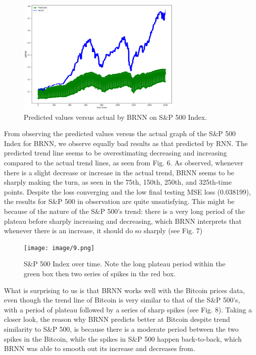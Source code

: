 \documentclass[letterpaper, 10 pt, conference]{ieeeconf}  %
\begin{document}
        \begin{figure}[thpb]
            \centering
            \includegraphics[width=8cm]{image/BiRNN/sp500_graph.png}
            \caption{Predicted values versus actual by BRNN on S\&P 500 Index.}
            \label{figurelabel}
        \end{figure}

        From observing the predicted values versus the actual graph of the S\&P 500 Index for BRNN, we observe equally bad results as that predicted by RNN. The predicted trend line seems to be overestimating decreasing and increasing compared to the actual trend lines, as seen from Fig. 6. As observed, whenever there is a slight decrease or increase in the actual trend, BRNN seems to be sharply making the turn, as seen in the 75th, 150th, 250th, and 325th-time points. Despite the loss converging and the low final testing MSE loss (0.038199), the results for S\&P 500 in observation are quite unsatisfying. This might be because of the nature of the S\&P 500's trend: there is a very long period of the plateau before sharply increasing and decreasing, which BRNN interprets that whenever there is an increase, it should do so sharply (see Fig. 7)

        \begin{figure}[thpb]
            \centering
            \texttt{[image: image/9.png]}
            \caption{S\&P 500 Index over time. Note the long plateau period within the green box then two series of spikes in the red box.}
            \label{figurelabel}
        \end{figure}
        
        What is surprising to us is that BRNN works well with the Bitcoin prices data, even though the trend line of Bitcoin is very similar to that of the S\&P 500's, with a period of plateau followed by a series of sharp spikes (see Fig. 8). Taking a closer look, the reason why BRNN predicts better at Bitcoin despite trend similarity to S\&P 500, is because there is a moderate period between the two spikes in the Bitcoin, while the spikes in S\&P 500 happen back-to-back, which BRNN was able to smooth out its increase and decreases from.
\end{document}
